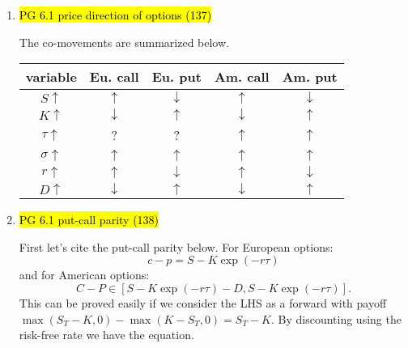 \documentclass[11pt]{article}
\newcommand{\E}{\text{E}}
\newcommand{\Var}{\text{Var}}
\newenvironment{note}{\begin{enumerate}[leftmargin=1em,topsep=0pt,noitemsep]}{\end{enumerate}}
\newcommand{\solution}{\boxed{\textbf{SOLUTION}}\hspace{.5em}}
\begin{document}
\begin{spacing}{1.1}
\begin{note}
\textbf{A}. Since $Z_t  = \sqrt{t}B_t$, we have for constant $t$, $Z_t$ is symmetric around $0$ and thus has $\E[Z_t]=0$ and $\Var[Z_t]=t^2$. However, to determine whether $Z_t$ is a martingale or not we need either to use its definition, which says conditional expectation is equal to the current expectation, or to prove that it's a Wiener process with no drift term. Use Ito's lemma and we can prove $Z_t$ has non-zero drift term, so it's not a martingale.

\textbf{B}. Similar to $\textbf{A}$, we need to use Ito's lemma and can actually show $f=W^3$ has a non-zero drift term, so it's not a martingale either.

\item \hl{PG 6.1 price direction of options (137)}

\solution The co-movements are summarized below.

\begin{center}
\begin{tabular}{ccccc} \toprule
variable          & Eu. call     & Eu. put      & Am. call     & Am. put      \\ \midrule    
$S \uparrow$      & $\uparrow$   & $\downarrow$ & $\uparrow$   & $\downarrow$ \\             
$K \uparrow$      & $\downarrow$ & $\uparrow$   & $\downarrow$ & $\uparrow$   \\             
$\tau \uparrow$   & ?            & ?            & $\uparrow$   & $\uparrow$   \\             
$\sigma \uparrow$ & $\uparrow$   & $\uparrow$   & $\uparrow$   & $\uparrow$   \\             
$r \uparrow$      & $\uparrow$   & $\downarrow$ & $\uparrow$   & $\downarrow$ \\             
$D \uparrow$      & $\downarrow$ & $\uparrow$   & $\downarrow$ & $\uparrow$   \\ \bottomrule 
\end{tabular}
\end{center}

\item \hl{PG 6.1 put-call parity (138)}

\solution First let's cite the put-call parity below. For European options:
$$
c - p = S - K\exp(-r\tau)
$$
and for American options:
$$
C - P \in [S - K\exp(-r\tau) - D, S - K\exp(-r\tau)].
$$
This can be proved easily if we consider the LHS as a forward with payoff $\max(S_T-K, 0) - \max(K - S_T, 0)=S_T - K$. By discounting using the risk-free rate we have the equation.


\end{note}
\end{spacing}
\end{document}
